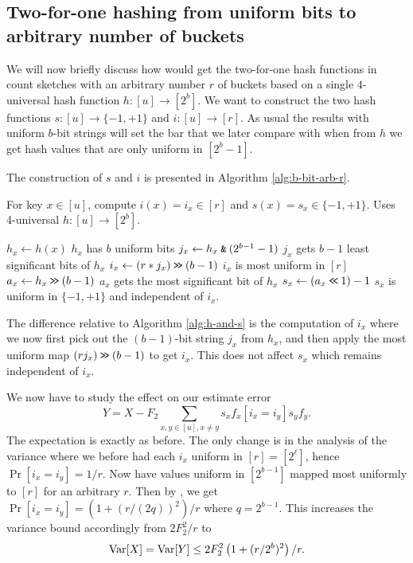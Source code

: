 \subsection{Two-for-one hashing from uniform bits to arbitrary number of buckets}
We will now briefly discuss how would get the two-for-one hash
functions in count sketches with an arbitrary number $r$ of buckets based
on a single $4$-universal hash function $h:[u]\to [2^b]$.  We want to
construct the two hash functions $s:[u]\to\{-1,+1\}$ and
$i:[u]\to[r]$. As usual the results with uniform $b$-bit strings will
set the bar that we later compare with when from $h$ we get hash values that
are only uniform in $[2^b-1]$.

The construction of $s$ and $i$ is presented in 
Algorithm \ref{alg:b-bit-arb-r}.
\begin{algorithm}[H]
   \caption{For key $x\in [u]$, compute $i(x)=i_x\in[r]$ and $s(x)=s_x\in\{-1,+1\}$.
   \newline
    Uses 4-universal $h:[u]\to [2^b]$.}
   \label{alg:b-bit-arb-r}
   \begin{algorithmic}
      \State $h_x\gets h(x)$
      \Comment $h_x$ has $b$ uniform bits
      \State $j_x\gets h_x\mathbin{\texttt{\&}}(2^{b-1}-1)$
      \Comment $j_x$ gets $b-1$ least significant bits of $h_x$
      \State $i_x\gets (r*j_x)\mathbin{\texttt{>\!>}} (b-1)$
      \Comment $i_x$ is most uniform in $[r]$
      \State $a_x\gets h_x\mathbin{\texttt{>\!>}} (b-1)$
      \Comment $a_x$ gets the most significant bit of $h_x$
      \State $s_x\gets (a_x\mathbin{\texttt{<\!<}} 1)-1$
      \Comment $s_x$ is uniform in $\{-1,+1\}$ and independent of $i_x$.
   \end{algorithmic}
\end{algorithm}
The difference relative to Algorithm \ref{alg:h-and-s} is the computation
of $i_x$ where we now first pick out the $(b-1)$-bit string $j_x$ from
$h_x$, and then apply the most uniform map $(rj_x)\mathbin{\texttt{>\!>}} (b-1)$
to get $i_x$. This does not affect $s_x$ which remains independent
of $i_x$. 

We now have to study the effect on our estimate error
\[Y=X-F_2\sum_{x,y\in[u],x\neq y} s_x f_x[i_x=i_y]s_y f_y.\]
The expectation is exactly as before. The only
change is in the analysis of the variance where
we before had each $i_x$ uniform in $[r]=[2^\ell]$, hence
$\Pr[i_x=i_y]=1/r$. Now have values uniform in $[2^{b-1}]$ mapped
most uniformly to $[r]$ for an arbitrary $r$. Then by ,
we get $\Pr[i_x=i_y]=\left(1+(r/(2q))^2\right)/r$ where $q=2^{b-1}$. 
This increases
the variance bound accordingly from $2F_2^2/r$ to
\begin{equation}\label{eq:Var-b-bit-arb-r}
   \operatorname*{Var}[X]=\operatorname*{Var}[Y]\leq 2F_2^2\left(1+(r/2^b)^2\right)/r.
\end{equation}

